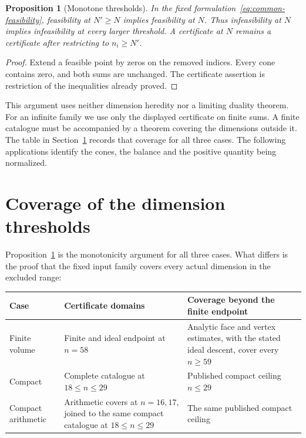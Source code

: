 \documentclass[11pt]{article}
\newtheorem{proposition}[theorem]{Proposition}
\theoremstyle{definition}
\theoremstyle{remark}
\numberwithin{equation}{section}
\begin{document}
\begin{proposition}[Monotone thresholds]\label{prop:threshold}
In the fixed formulation~\eqref{eq:common-feasibility}, feasibility
at $N'\ge N$ implies feasibility at $N$. Thus infeasibility at $N$
implies infeasibility at every larger threshold. A certificate at
$N$ remains a certificate after restricting to $n_i\ge N'$.
\end{proposition}
\begin{proof}
Extend a feasible point by zeros on the removed indices. Every cone
contains zero, and both sums are unchanged. The certificate assertion
is restriction of the inequalities already proved.
\end{proof}

This argument uses neither dimension heredity nor a limiting duality
theorem. For an infinite family we use only the displayed certificate
on finite sums. A finite catalogue must be accompanied by a theorem
covering the dimensions outside it. The table in
Section~\ref{sec:thresholds} records that coverage for all three cases.
The following applications identify the cones, the balance and the
positive quantity being normalized.





\section{Coverage of the dimension thresholds}
\label{sec:thresholds}

Proposition~\ref{prop:threshold} is the monotonicity argument for all
three cases. What differs is the proof that the fixed input family
covers every actual dimension in the excluded range:

\begin{center}\small
\begin{tabular}{>{\raggedright\arraybackslash}p{.17\linewidth}
 >{\raggedright\arraybackslash}p{.35\linewidth}
 >{\raggedright\arraybackslash}p{.38\linewidth}}
\toprule
Case&Certificate domains&Coverage beyond the finite endpoint\\\midrule
Finite volume&Finite and ideal endpoint at $n=58$&Analytic face and
 vertex estimates, with the stated ideal descent, cover every $n\ge59$\\
Compact&Complete catalogue at $18\le n\le29$&Published compact
 ceiling $n\le29$\\
Compact arithmetic&Arithmetic covers at $n=16,17$, joined to the
 same compact catalogue at $18\le n\le29$&The same published compact
 ceiling\\\bottomrule
\end{tabular}
\end{center}
\end{document}

